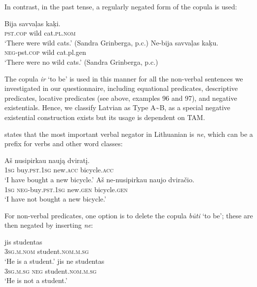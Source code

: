 \documentclass[output=paper,colorlinks,citecolor=brown]{langscibook}
\begin{document}
\begin{paperappendix}
\begin{unindented}
In contrast, in the past tense, a regularly negated form of the copula is used:
%
\begin{exe}\ex \begin{xlist}
\ex\gll Bija savvaļas kaķi. \\
\textsc{pst.cop} wild cat.\textsc{pl.nom} \\
    \glt `There were wild cats.' (Sandra Grinberga, p.c.)
\ex\gll Ne-bija savvaļas kaķu.\\
\textsc{neg}-pst.\textsc{cop} wild cat.pl.gen\\
\glt `There were no wild cats.' (Sandra Grinberga, p.c.)
    \end{xlist}\end{exe}

The copula \textit{ir} `to be' is used in this manner for all the non-verbal sentences we investigated in our questionnaire, including equational predicates, descriptive predicates, locative predicates (see above, examples 96 and 97), and negative existentials. Hence, we classify Latvian as Type A{\textasciitilde}B, as a special negative existential construction exists but its usage is dependent on TAM. 


\citet[176--177]{Mathiassen1996} states that the most important verbal negator in Lithuanian is \textit{ne}, which can be a prefix for verbs and other word classes:
%
\begin{exe}\ex \gll Aš nusipirkau naują dviratį. \\
\textsc{1sg} buy.\textsc{pst.1sg} new.\textsc{acc} bicycle.\textsc{acc} \\
    \glt `I have bought a new bicycle.' \citep[185]{Mathiassen1996}
\ex \gll Aš ne-nusipirkau naujo dviračio. \\
\textsc{1sg} \textsc{neg}-buy\textsc{.pst.1sg} new.\textsc{gen} bicycle.\textsc{gen} \\
    \glt `I have not bought a new bicycle.' \citep[185]{Mathiassen1996}
    \end{exe}

For non-verbal predicates, one option is to delete the copula \textit{būti} `to be'; these are then negated by inserting \textit{ne}:
%
\begin{exe}\ex \gll jis studentas \\
\textsc{3sg.m.nom} student.\textsc{nom.m.sg} \\
    \glt `He is a student.' \citep[176]{Mathiassen1996}
\ex \gll jis ne studentas \\
\textsc{3sg.m.sg} \textsc{neg}  student.\textsc{nom.m.sg} \\
    \glt `He is not a student.' \citep[176]{Mathiassen1996}
    \end{exe}


\end{unindented}
\end{paperappendix}
\end{document}
